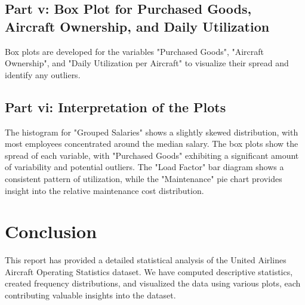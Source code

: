 \documentclass[a4paper,12pt]{article}
\begin{document}

\subsection{Part v: Box Plot for Purchased Goods, Aircraft Ownership, and Daily Utilization}
Box plots are developed for the variables "Purchased Goods", "Aircraft Ownership", and "Daily Utilization per Aircraft" to visualize their spread and identify any outliers.



\subsection{Part vi: Interpretation of the Plots}
The histogram for "Grouped Salaries" shows a slightly skewed distribution, with most employees concentrated around the median salary. The box plots show the spread of each variable, with "Purchased Goods" exhibiting a significant amount of variability and potential outliers. The "Load Factor" bar diagram shows a consistent pattern of utilization, while the "Maintenance" pie chart provides insight into the relative maintenance cost distribution.

\section*{Conclusion}
This report has provided a detailed statistical analysis of the United Airlines Aircraft Operating Statistics dataset. We have computed descriptive statistics, created frequency distributions, and visualized the data using various plots, each contributing valuable insights into the dataset.
\end{document}
